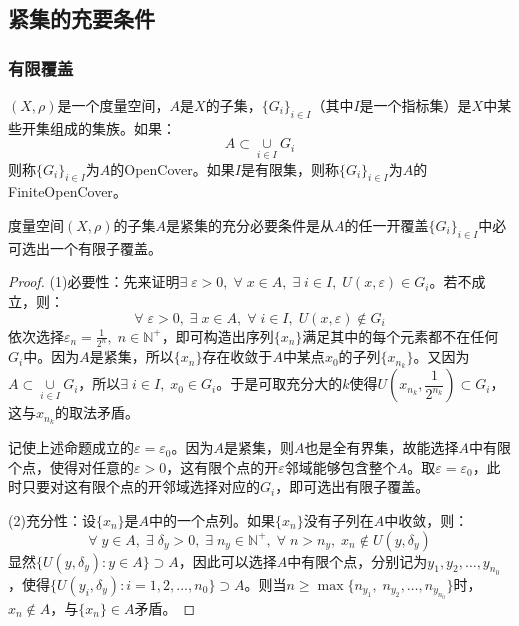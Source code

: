 \subsection{紧集的充要条件}
\subsubsection{有限覆盖}
\begin{definition}
	$(X,\rho)$是一个度量空间，$A$是$X$的子集，$\{G_i\}_{i\in I}$（其中$I$是一个指标集）是$X$中某些开集组成的集族。如果：
	\begin{equation*}
		A\subset\underset{i\in I}{\cup}G_i
	\end{equation*}
	则称$\{G_i\}_{i\in I}$为$A$的\gls{OpenCover}。如果$I$是有限集，则称$\{G_i\}_{i\in I}$为$A$的\gls{FiniteOpenCover}。
\end{definition}
\begin{theorem}[有限覆盖定理]
	度量空间$(X,\rho)$的子集$A$是紧集的充分必要条件是从$A$的任一开覆盖$\{G_i\}_{i\in I}$中必可选出一个有限子覆盖。
\end{theorem}
\begin{proof}
	(1)必要性：先来证明$\exists\;\varepsilon>0,\;\forall\;x\in A,\;\exists\;i\in I,\;U(x,\varepsilon)\in G_i$。若不成立，则：
	\begin{equation*}
		\forall\;\varepsilon>0,\;\exists\;x\in A,\;\forall\;i\in I,\;U(x,\varepsilon)\notin G_i
	\end{equation*}
	依次选择$\varepsilon_n=\frac{1}{2^n},\;n\in\mathbb{N}^+$，即可构造出序列$\{x_n\}$满足其中的每个元素都不在任何$G_i$中。因为$A$是紧集，所以$\{x_n\}$存在收敛于$A$中某点$x_0$的子列$\{x_{n_k}\}$。又因为$A\subset\underset{i\in I}{\cup}G_i$，所以$\exists\;i\in I,\;x_0\in G_i$。于是可取充分大的$k$使得$U\left(x_{n_k},\dfrac{1}{2^{n_k}}\right)\subset G_i$，这与$x_{n_k}$的取法矛盾。\par
	记使上述命题成立的$\varepsilon=\varepsilon_0$。因为$A$是紧集，则$A$也是全有界集，故能选择$A$中有限个点，使得对任意的$\varepsilon>0$，这有限个点的开$\varepsilon$邻域能够包含整个$A$。取$\varepsilon=\varepsilon_0$，此时只要对这有限个点的开邻域选择对应的$G_i$，即可选出有限子覆盖。\par
	(2)充分性：设$\{x_n\}$是$A$中的一个点列。如果$\{x_n\}$没有子列在$A$中收敛，则：
	\begin{equation*}
		\forall\;y\in A,\;\exists\;\delta_y>0,\;\exists\;n_y\in\mathbb{N}^+,\;\forall\;n>n_y,\;x_n\notin U(y,\delta_y)
	\end{equation*}
	显然$\{U(y,\delta_y):y\in A\}\supset A$，因此可以选择$A$中有限个点，分别记为$y_1,y_2,\dots,y_{n_0}$，使得$\{U(y_i,\delta_y):i=1,2,\dots,n_0\}\supset A$。则当$n\geqslant
	\max\{n_{y_1},\;n_{y_2},\dots,n_{y_{n_0}}\}$时，$x_n\notin A$，与$\{x_n\}\in A$矛盾。
\end{proof}
